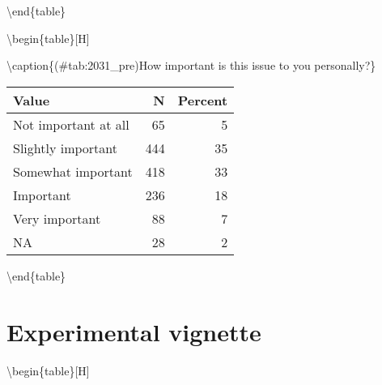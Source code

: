 \documentclass[
]{book}
\begin{document}
\textbackslash end\{table\}

\textbackslash begin\{table\}{[}H{]}

\textbackslash caption\{(\#tab:2031\_pre)How important is this issue to you personally?\}
\centering

\begin{tabular}[t]{lrr}
\toprule
Value & N & Percent\\
\midrule
Not important at all & 65 & 5\\
Slightly important & 444 & 35\\
Somewhat important & 418 & 33\\
Important & 236 & 18\\
Very important & 88 & 7\\
NA & 28 & 2\\
\bottomrule
\end{tabular}

\textbackslash end\{table\}

\hypertarget{experimental-vignette-1}{%
\section{Experimental vignette}\label{experimental-vignette-1}}

\textbackslash begin\{table\}{[}H{]}
\end{document}
